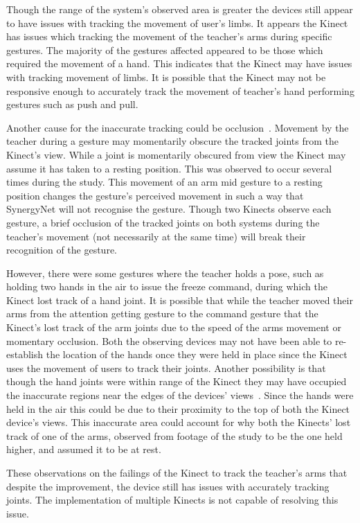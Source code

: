 \documentclass[link]{IWCOMP}
\begin{document}
Though the range of the system's observed area is greater the devices still appear to have issues with tracking the movement of user's limbs.
It appears the Kinect has issues which tracking the movement of the teacher's arms during specific gestures.
The majority of the gestures affected appeared to be those which required the movement of a hand.
This indicates that the Kinect may have issues with tracking movement of limbs.
It is possible that the Kinect may not be responsive enough to accurately track the movement of teacher's hand performing gestures such as push and pull.

Another cause for the inaccurate tracking could be occlusion~\cite{Meng2012}.
Movement by the teacher during a gesture may momentarily obscure the tracked joints from the Kinect's view.
While a joint is momentarily obscured from view the Kinect may assume it has taken to a resting position.
This was observed to occur several times during the study.
This movement of an arm mid gesture to a resting position changes the gesture's perceived movement in such a way that SynergyNet will not recognise the gesture.
Though two Kinects observe each gesture, a brief occlusion of the tracked joints on both systems during the teacher's movement (not necessarily at the same time) will break their recognition of the gesture.

However, there were some gestures where the teacher holds a pose, such as holding two hands in the air to issue the freeze command, during which the Kinect lost track of a hand joint.
It is possible that while the teacher moved their arms from the attention getting gesture to the command gesture that the Kinect's lost track of the arm joints due to the speed of the arms movement or momentary occlusion.
Both the observing devices may not have been able to re-establish the location of the hands once they were held in place since the Kinect uses the movement of users to track their joints.
Another possibility is that though the hand joints were within range of the Kinect they may have occupied the inaccurate regions near the edges of the devices' views~\cite{Mehrotra2011}.
Since the hands were held in the air this could be due to their proximity to the top of both the Kinect device's views.
This inaccurate area could account for why both the Kinects' lost track of one of the arms, observed from footage of the study to be the one held higher, and assumed it to be at rest.

These observations on the failings of the Kinect to track the teacher's arms that despite the improvement, the device still has issues with accurately tracking joints.
The implementation of multiple Kinects is not capable of resolving this issue.
\end{document}
